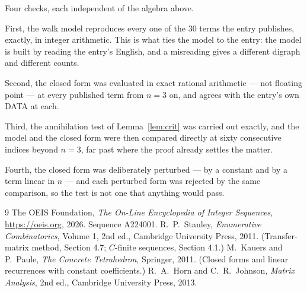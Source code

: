 \documentclass[11pt,a4paper]{article}
\theoremstyle{plain}
\theoremstyle{definition}
\begin{document}
Four checks, each independent of the algebra above.

First, the walk model reproduces every one of the $30$ terms the entry publishes,
exactly, in integer arithmetic. This is what ties the model to the entry: the model is built
by reading the entry's English, and a misreading gives a different digraph and different
counts.

Second, the closed form was evaluated in exact rational arithmetic --- not floating point ---
at every published term from $n=3$ on, and agrees with the entry's own DATA at each.

Third, the annihilation test of Lemma~\ref{lem:crit} was carried out exactly, and the model
and the closed form were then compared directly at sixty consecutive indices beyond
$n=3$, far past where the proof already settles the matter.

Fourth, the closed form was deliberately perturbed --- by a constant and by a term linear in
$n$ --- and each perturbed form was rejected by the same comparison, so the test is not one
that anything would pass.

\begin{thebibliography}{9}
 The OEIS Foundation, \emph{The On-Line Encyclopedia of Integer
Sequences}, \url{https://oeis.org}, 2026. Sequence A224001.
 R.~P.~Stanley, \emph{Enumerative Combinatorics}, Volume 1, 2nd ed.,
Cambridge University Press, 2011. (Transfer-matrix method, Section 4.7; $C$-finite sequences,
Section 4.1.)
 M.~Kauers and P.~Paule, \emph{The Concrete Tetrahedron}, Springer, 2011.
(Closed forms and linear recurrences with constant coefficients.)
 R.~A.~Horn and C.~R.~Johnson, \emph{Matrix Analysis}, 2nd ed., Cambridge
University Press, 2013.
\end{thebibliography}
\end{document}
